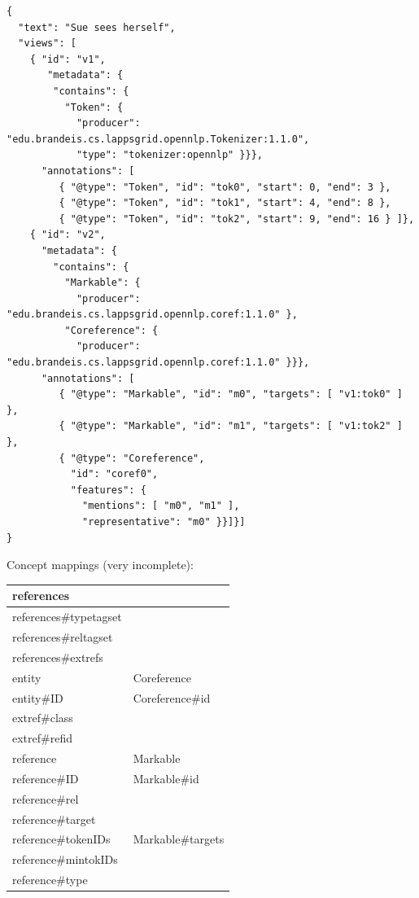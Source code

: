 \documentclass[11pt]{article}
\newenvironment{example}
    {\begin{tcolorbox}\small}
    {\end{tcolorbox}}
\newenvironment{mappings}
	{\medskip\begin{tabular}{|l|l|}\hline}
	{\hline\end{tabular}\medskip}
\begin{document}
\begin{example}
\begin{verbatim}
{
  "text": "Sue sees herself",
  "views": [
    { "id": "v1",
       "metadata": {
        "contains": {
          "Token": {
            "producer": "edu.brandeis.cs.lappsgrid.opennlp.Tokenizer:1.1.0",
            "type": "tokenizer:opennlp" }}},
      "annotations": [
         { "@type": "Token", "id": "tok0", "start": 0, "end": 3 },
         { "@type": "Token", "id": "tok1", "start": 4, "end": 8 },
         { "@type": "Token", "id": "tok2", "start": 9, "end": 16 } ]},
    { "id": "v2",
      "metadata": {
        "contains": {
          "Markable": {
            "producer": "edu.brandeis.cs.lappsgrid.opennlp.coref:1.1.0" },
          "Coreference": {
            "producer": "edu.brandeis.cs.lappsgrid.opennlp.coref:1.1.0" }}},
      "annotations": [
         { "@type": "Markable", "id": "m0", "targets": [ "v1:tok0" ] },
         { "@type": "Markable", "id": "m1", "targets": [ "v1:tok2" ] },
         { "@type": "Coreference",
           "id": "coref0",
           "features": {
             "mentions": [ "m0", "m1" ],
             "representative": "m0" }}]}]
}
\end{verbatim}
\end{example}

Concept mappings (very incomplete):

\begin{mappings}
references				& \\ \hline
references\#typetagset	& 											\\ \hline
references\#reltagset	&											\\ \hline
references\#extrefs		& 											\\ \hline
entity					& Coreference 								\\ \hline
entity\#ID				& Coreference\#id							\\ \hline
extref\#class 			& 								 			\\ \hline
extref\#refid 			&											\\ \hline
reference 				& Markable									\\ \hline
reference\#ID 			& Markable\#id								\\ \hline
reference\#rel			& 											\\ \hline
reference\#target 		& 											\\ \hline
reference\#tokenIDs 	& Markable\#targets							\\ \hline
reference\#mintokIDs 	& 											\\ \hline
reference\#type 		& 											\\ \hline
\end{mappings}
\end{document}
